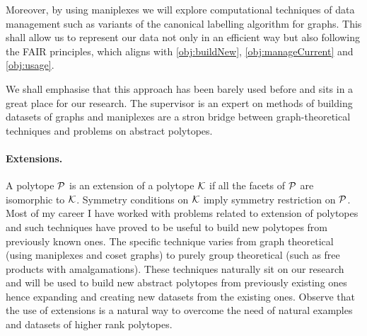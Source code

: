 Moreover, by using maniplexes we will explore computational techniques of data management such as variants of the canonical labelling algorithm for graphs.
This shall allow us to represent our data not only in an efficient way but also following the FAIR principles, which aligns with \cref{obj:buildNew}, \cref{obj:manageCurrent} and \cref{obj:usage}.

We shall emphasise that this approach has been barely used before and sits in a great place for our research.
The supervisor is an expert on methods of building datasets of graphs and maniplexes are a stron bridge between graph-theoretical techniques and problems on abstract polytopes.


\paragraph{Extensions.} A polytope $\mathcal{P}$ is an extension of a polytope $\mathcal{K}$ if all the facets of $\mathcal{P}$ are isomorphic to $\mathcal{K}$. Symmetry conditions on $\mathcal{K}$ imply symmetry restriction on $\mathcal{P}$.
Most of my career I have worked with problems related to extension of polytopes and such techniques have proved to be useful to build new polytopes from previously known ones.
The specific technique varies from graph theoretical (using maniplexes and coset graphs) to purely group theoretical (such as free products with amalgamations).
These techniques naturally sit on our research and will be used to build new abstract polytopes from previously existing ones hence expanding and creating new datasets from the existing ones.
Observe that the use of extensions is a natural way to overcome the need of natural examples and datasets of higher rank polytopes.

